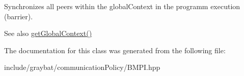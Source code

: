 Synchronizes all peers within the global\+Context in the programm execution (barrier). 

\begin{DoxySeeAlso}{See also}
\hyperlink{structgraybat_1_1communicationPolicy_1_1BMPI_aaaaaec7667d29a126cfc883cf552da31}{get\+Global\+Context()} 
\end{DoxySeeAlso}


The documentation for this class was generated from the following file\+:\begin{DoxyCompactItemize}
\item 
include/graybat/communication\+Policy/B\+M\+P\+I.\+hpp\end{DoxyCompactItemize}
